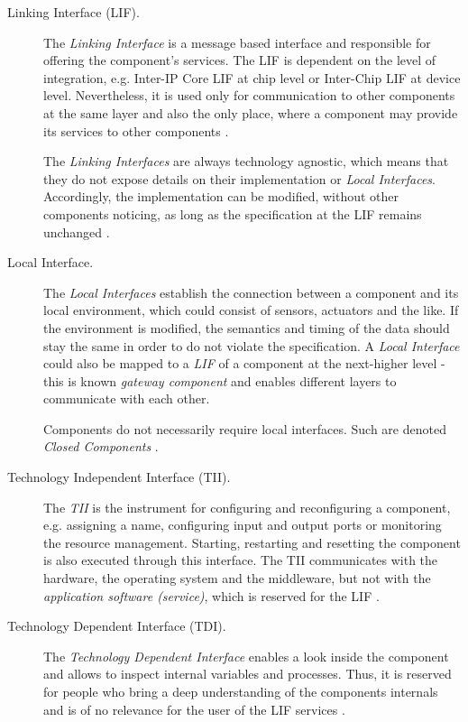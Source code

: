 \begin{description}
\item [Linking Interface (LIF).] 
The \emph{Linking Interface} is a message based interface and responsible for offering the component's services. The LIF is dependent on the level of integration, e.g. Inter-IP Core LIF at chip level or Inter-Chip LIF at device level. Nevertheless, it is used only for communication to other components at the same layer and also the only place, where a component may provide its services to other components \cite[p.9]{genesys}.

The \emph{Linking Interfaces} are always technology agnostic, which means that they do not expose details on their implementation or \emph{Local Interfaces}. Accordingly, the implementation can be modified, without other components noticing, as long as the specification at the LIF remains unchanged \cite[p.9, 40-41]{genesys}.

\item [Local Interface.] 
The \emph{Local Interfaces} establish the connection between a component and its local environment, which could consist of sensors, actuators and the like. If the environment is modified, the semantics and timing of the data should stay the same in order to do not violate the specification. A \emph{Local Interface} could also be mapped to a \emph{LIF} of a component at the next-higher level - this is known \emph{gateway component} and enables different layers to communicate with each other.

Components do not necessarily require local interfaces. Such are denoted \emph{Closed Components} \cite[p.40-41]{genesys}.

\item [Technology Independent Interface (TII).]
The \emph{TII} is the instrument for configuring and reconfiguring a component, e.g. assigning a name, configuring input and output ports or monitoring the resource management. Starting, restarting and resetting the component is also executed through this interface. The TII communicates with the hardware, the operating system and the middleware, but not with the \emph{application software (service)}, which is reserved for the LIF \cite[p.40-41]{genesys}.

\item [Technology Dependent Interface (TDI).] 
The \emph{Technology Dependent Interface} enables a look inside the component and allows to inspect internal variables and processes. Thus, it is reserved for people who bring a deep understanding of the components internals and is of no relevance for the user of the LIF services \cite[p.40-41]{genesys}. 
\end{description}

